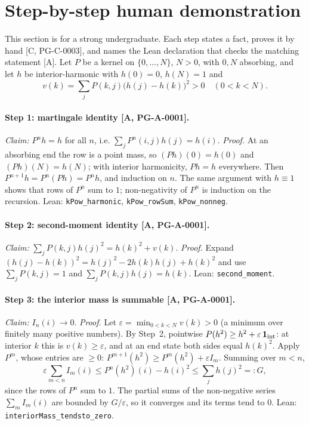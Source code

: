 \documentclass[11pt]{article}
\theoremstyle{remark}
\newcommand{\tier}[1]{\textsf{[#1]}}
\newcommand{\lean}[1]{\texttt{#1}}
\begin{document}
\section{Step-by-step human demonstration}\label{sec:human}
This section is for a strong undergraduate. Each step states a fact, proves it by hand \tier{C, PG-C-0003}, and names
the Lean declaration that checks the matching statement \tier{A}. Let $P$ be a kernel on $\{0,\dots,N\}$, $N>0$, with
$0,N$ absorbing, and let $h$ be interior-harmonic with $h(0)=0$, $h(N)=1$ and
\[
v(k)=\sum_jP(k,j)\bigl(h(j)-h(k)\bigr)^2>0\quad(0<k<N).
\]

\paragraph{Step 1: martingale identity \tier{A, PG-A-0001}.} \emph{Claim:} $P^nh=h$ for all $n$, i.e.
$\sum_jP^n(i,j)h(j)=h(i)$. \emph{Proof.} At an absorbing end the row is a point mass, so $(Ph)(0)=h(0)$ and
$(Ph)(N)=h(N)$; with interior harmonicity, $Ph=h$ everywhere. Then $P^{n+1}h=P^n(Ph)=P^nh$, and induction on $n$.
The same argument with $h\equiv1$ shows that rows of $P^n$ sum to $1$; non-negativity of $P^n$ is induction on the recursion.
Lean: \lean{kPow\_harmonic}, \lean{kPow\_rowSum}, \lean{kPow\_nonneg}.

\paragraph{Step 2: second-moment identity \tier{A, PG-A-0001}.} \emph{Claim:}
$\sum_jP(k,j)h(j)^2=h(k)^2+v(k)$. \emph{Proof.} Expand $(h(j)-h(k))^2=h(j)^2-2h(k)h(j)+h(k)^2$ and use
$\sum_jP(k,j)=1$ and $\sum_jP(k,j)h(j)=h(k)$. Lean: \lean{second\_moment}.

\paragraph{Step 3: the interior mass is summable \tier{A, PG-A-0001}.} \emph{Claim:} $I_n(i)\to0$. \emph{Proof.} Let
$\varepsilon=\min_{0<k<N}v(k)>0$ (a minimum over finitely many positive numbers). By Step~2, pointwise
$P(h^2)\ge h^2+\varepsilon\,\mathbf 1_{\rm int}$: at interior $k$ this is $v(k)\ge\varepsilon$, and at an end state both sides
equal $h(k)^2$. Apply $P^m$, whose entries are $\ge0$: $P^{m+1}(h^2)\ge P^m(h^2)+\varepsilon I_m$. Summing over $m<n$,
\[
\varepsilon\sum_{m<n}I_m(i)\le P^n(h^2)(i)-h(i)^2\le\sum_jh(j)^2=:G,
\]
since the rows of $P^n$ sum to $1$. The partial sums of the non-negative series $\sum_mI_m(i)$ are bounded by $G/\varepsilon$,
so it converges and its terms tend to $0$. Lean: \lean{interiorMass\_tendsto\_zero}.
\end{document}
